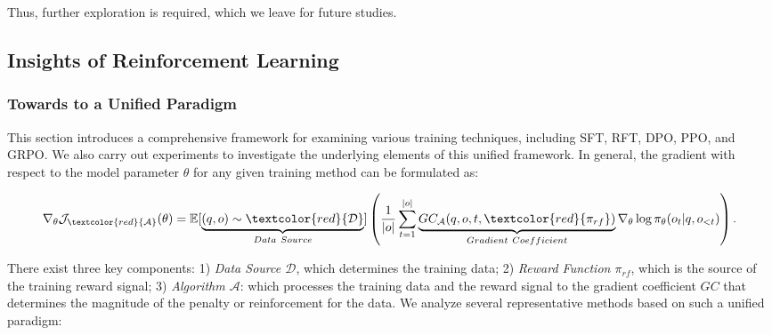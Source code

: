 \begin{itemize}[topsep=0pt]
\begin{itemize}[topsep=0pt]
Thus, further exploration is required, which we leave for future studies.

\subsection{Insights of Reinforcement Learning}
\subsubsection{Towards to a Unified Paradigm} This section introduces a comprehensive framework for examining various training techniques, including SFT, RFT, DPO, PPO, and GRPO. We also carry out experiments to investigate the underlying elements of this unified framework. In general, the gradient with respect to the model parameter $\theta$ for any given training method can be formulated as:

\begin{equation}
    \nabla_{\theta}\mathcal{J}_{\textcolor{red}{\mathcal{A}}}(\theta) = \mathbb{E}[\underbrace{(q,o) \sim \textcolor{red}{\mathcal{D}}}_{Data \ Source}]\left( \frac{1}{|o|} \sum_{t=1}^{|o|}  \underbrace{GC_{{\mathcal{A}}}(q, o, t, \textcolor{red}{\pi_{{rf}}})}_{Gradient \ Coefficient}  \nabla_{\theta}\log \pi_{\theta}(o_t | q, o_{<t})\right).
\label{eq:objective}
\end{equation}

There exist three key components: 1) \textit{Data Source $\mathcal{D}$}, which determines the training data; 2) \textit{Reward Function $\pi_{{rf}}$}, which is the source of the training reward signal; 3) \textit{Algorithm $\mathcal{A}$}: which processes the training data and the reward signal to the gradient coefficient $GC$ that determines the magnitude of the penalty or reinforcement for the data. We analyze several representative methods based on such a unified paradigm:


\end{itemize}
\end{itemize}
